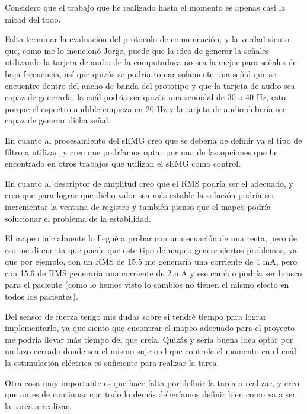Considero que el trabajo que he realizado hasta el momento es apenas casi la mitad del todo.

Falta terminar la evaluación del protocolo de comunicación, y la verdad siento que, como me lo mencionó Jorge, puede que la idea de generar la señales utilizando la tarjeta de audio de la computadora no sea la mejor para señales de baja frecuencia, así que quizás se podría tomar solamente una señal que se encuentre dentro del ancho de banda del prototipo y que la tarjeta de audio sea capaz de generarla, la cuál podría ser quizás una senoidal de 30 o 40 Hz, esto porque el espectro audible empieza en 20 Hz y la tarjeta de audio debería ser capaz de generar dicha señal.

En cuanto al procesamiento del sEMG creo que se debería de definir ya el tipo de filtro a utilizar, y creo que podríamos optar por una de las opciones que he encontrado en otros trabajos que utilizan el sEMG como control.

En cuanto al descriptor de amplitud creo que el RMS podría ser el adecuado, y creo que para lograr que dicho valor sea más estable la solución podría ser incrementar la ventana de registro y también pienso que el mapeo podría solucionar el problema de la estabilidad.

El mapeo inicialmente lo llegué a probar con una ecuación de una recta, pero de eso me di cuenta que puede que este tipo de mapeo genere ciertos problemas, ya que por ejemplo, con un RMS de 15.5 me generaría una corriente de 1 mA, pero con 15.6 de RMS generaría una corriente de 2 mA y ese cambio podría ser brusco para el paciente (como lo hemos visto lo cambios no tienen el mismo efecto en todos los pacientes).

Del sensor de fuerza tengo mis dudas sobre si tendré tiempo para lograr implementarlo, ya que siento que encontrar el mapeo adecuado para el proyecto me podría llevar más tiempo del que creía. Quizás y sería buena idea optar por un lazo cerrado donde sea el mismo sujeto el que controle el momento en el cuál la estimulación eléctrica es suficiente para realizar la tarea.

Otra cosa muy importante es que hace falta por definir la tarea a realizar, y creo que antes de continuar con todo lo demás deberíamos definir bien como va a ser la tarea a realizar.